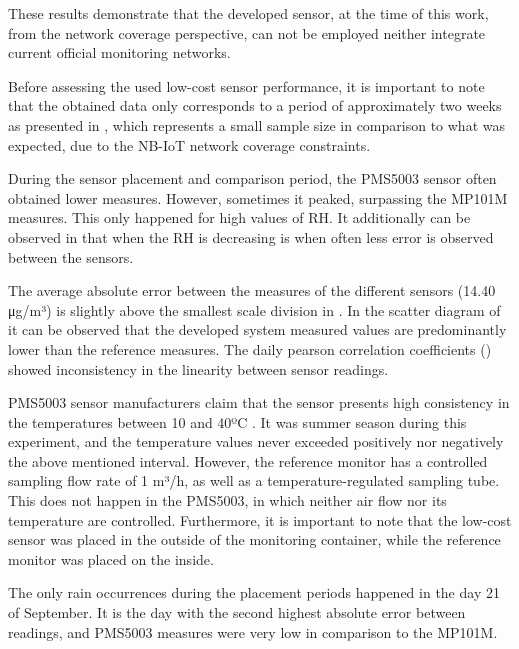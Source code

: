 These results demonstrate that the developed sensor, at the time of this work, from the network coverage perspective, can not be employed neither integrate current official monitoring networks.

Before assessing the used low-cost sensor performance, it is important to note that the obtained data only corresponds to a period of approximately two weeks as presented in , which represents a small sample size in comparison to what was expected, due to the NB-IoT network coverage constraints.



During the sensor placement and comparison period, the PMS5003 sensor often obtained lower measures. However, sometimes it peaked, surpassing the MP101M measures. This only happened for high values of RH. It additionally can be observed in  that when the RH is decreasing is when often less error is observed between the sensors.

The average absolute error between the measures of the different sensors (14.40 μg/m³) is slightly above the smallest scale division in . In the scatter diagram of  it can be observed that the developed system measured values are predominantly lower than the reference measures. The daily pearson correlation coefficients () showed inconsistency in the linearity between sensor readings.

PMS5003 sensor manufacturers claim that the sensor presents high consistency in the temperatures between 10 and 40ºC \cite{Sayahi2018}. It was summer season during this experiment, and the temperature values never exceeded positively nor negatively the above mentioned interval. 
However, the reference monitor has a controlled sampling flow rate of 1 m³/h, as well as a temperature-regulated sampling tube. This does not happen in the PMS5003, in which neither air flow nor its temperature are controlled.
Furthermore, it is important to note that the low-cost sensor was placed in the outside of the monitoring container, while the reference monitor was placed on the inside.

The only rain occurrences during the placement periods happened in the day 21 of September. It is the day with the second highest absolute error between readings, and PMS5003 measures were very low in comparison to the MP101M.


